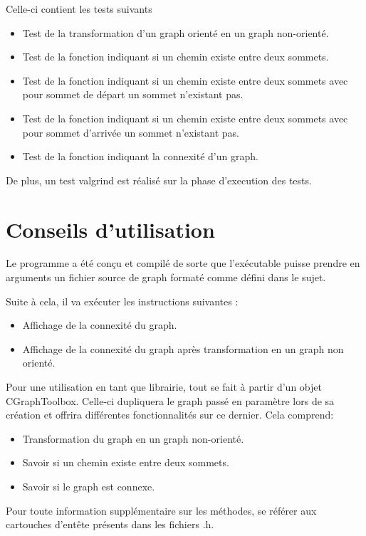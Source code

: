 		Celle-ci contient les tests suivants
		\begin{itemize}
			\item Test de la transformation d'un graph orienté en un graph non-orienté.
			\item Test de la fonction indiquant si un chemin existe entre deux sommets.
			\item Test de la fonction indiquant si un chemin existe entre deux sommets avec pour sommet de départ un sommet n'existant pas.
			\item Test de la fonction indiquant si un chemin existe entre deux sommets avec pour sommet d'arrivée un sommet n'existant pas.
			\item Test de la fonction indiquant la connexité d'un graph.
		\end{itemize}
		
		De plus, un test valgrind est réalisé sur la phase d'execution des tests.
			
	\chapter{Conseils d'utilisation}
	Le programme a été conçu et compilé de sorte que l'exécutable puisse prendre en arguments un fichier source de graph formaté comme défini dans le sujet.
	
	Suite à cela, il va exécuter les instructions suivantes :
	\begin{itemize}
		\item Affichage de la connexité du graph.
		\item Affichage de la connexité du graph après transformation en un graph non orienté. \\
	\end{itemize}
	Pour une utilisation en tant que librairie, tout se fait à partir d'un objet CGraphToolbox. Celle-ci dupliquera le graph passé en paramètre lors de sa création et offrira différentes fonctionnalités sur ce dernier. Cela comprend:
	\begin{itemize}
		\item Transformation du graph en un graph non-orienté.
		\item Savoir si un chemin existe entre deux sommets.
		\item Savoir si le graph est connexe.\\
	\end{itemize}
	
	Pour toute information supplémentaire sur les méthodes, se référer aux cartouches d'entête présents dans les fichiers .h.

